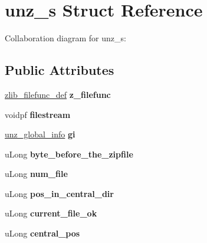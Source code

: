 \hypertarget{structunz__s}{\section{unz\+\_\+s Struct Reference}
\label{structunz__s}
}


Collaboration diagram for unz\+\_\+s\+:
\subsection*{Public Attributes}
\begin{DoxyCompactItemize}
\item 
\hypertarget{structunz__s_a7be6cd9deaecd46f98f462bf6594baf1}{\hyperlink{structzlib__filefunc__def__s}{zlib\+\_\+filefunc\+\_\+def} {\bfseries z\+\_\+filefunc}}\label{structunz__s_a7be6cd9deaecd46f98f462bf6594baf1}

\item 
\hypertarget{structunz__s_a40596bc73de7dacd226048d4334b5c78}{voidpf {\bfseries filestream}}\label{structunz__s_a40596bc73de7dacd226048d4334b5c78}

\item 
\hypertarget{structunz__s_a131303f89af11a26b53e99a58d6517cf}{\hyperlink{structunz__global__info__s}{unz\+\_\+global\+\_\+info} {\bfseries gi}}\label{structunz__s_a131303f89af11a26b53e99a58d6517cf}

\item 
\hypertarget{structunz__s_a788688a8021cbbba6a2ac1765edd362e}{u\+Long {\bfseries byte\+\_\+before\+\_\+the\+\_\+zipfile}}\label{structunz__s_a788688a8021cbbba6a2ac1765edd362e}

\item 
\hypertarget{structunz__s_a737337b347bd5cc52bfabdcfbc11b853}{u\+Long {\bfseries num\+\_\+file}}\label{structunz__s_a737337b347bd5cc52bfabdcfbc11b853}

\item 
\hypertarget{structunz__s_a70f2901a7ba85573aa280bad826baf4a}{u\+Long {\bfseries pos\+\_\+in\+\_\+central\+\_\+dir}}\label{structunz__s_a70f2901a7ba85573aa280bad826baf4a}

\item 
\hypertarget{structunz__s_abe2244ba62db8b3251634e26183f1c9a}{u\+Long {\bfseries current\+\_\+file\+\_\+ok}}\label{structunz__s_abe2244ba62db8b3251634e26183f1c9a}

\item 
\hypertarget{structunz__s_a2d8ae4c0975d2057e30b13c3148c27eb}{u\+Long {\bfseries central\+\_\+pos}}\label{structunz__s_a2d8ae4c0975d2057e30b13c3148c27eb}


\end{DoxyCompactItemize}
